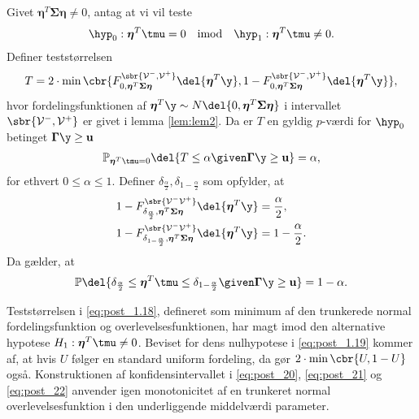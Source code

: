 \begin{lem} \label{lem:lem4}
Givet \(\boldsymbol{\eta}^T \boldsymbol{\Sigma} \boldsymbol{\eta} \neq 0\), antag at vi vil teste
\begin{align*}
\hyp_0: \boldsymbol{\eta}^T \tmu=0 \quad \text{imod} \quad \hyp_1: \boldsymbol{\eta}^T \tmu \neq 0.
\end{align*}
Definer teststørrelsen
\begin{align}
T=2 \cdot \min\cbr{F_{0, \boldsymbol{\eta}^T \boldsymbol{\Sigma} \boldsymbol{\eta}}^{\sbr{\mathcal{V}^-, \mathcal{V}^+}} \del{\boldsymbol{\eta}^T \y}, 1 - F_{0, \boldsymbol{\eta}^T \boldsymbol{\Sigma} \boldsymbol{\eta}}^{\sbr{\mathcal{V}^-, \mathcal{V}^+}} \del{\boldsymbol{\eta}^T \y}}, \label{eq:post_1.18}
\end{align}
hvor fordelingsfunktionen af \(\boldsymbol{\eta}^T \y \sim N \del{0,  \boldsymbol{\eta}^T \boldsymbol{\Sigma} \boldsymbol{\eta}}\) i intervallet \(\sbr{\mathcal{V}^-, \mathcal{V}^+}\) er givet i lemma \ref{lem:lem2}.
Da er \(T\) en gyldig \(p\)-værdi for \(\hyp_0\) betinget \(\boldsymbol{\Gamma} \y \geq \mathbf{u}\)
\begin{align}
\mathbb{P}_{\boldsymbol{\eta}^T \tmu=0} \del{T \leq \alpha \given \boldsymbol{\Gamma} \y \geq \mathbf{u}} = \alpha, \label{eq:post_1.19}
\end{align}
for ethvert \(0 \leq \alpha \leq 1\). 
Definer \(\delta_{\frac{\alpha}{2}}, \delta_{1-\frac{\alpha}{2}}\) som opfylder, at
\begin{align}
1-F_{\delta_{\frac{\alpha}{2}}, \boldsymbol{\eta}^T \boldsymbol{\Sigma} \boldsymbol{\eta}}^{\sbr{\mathcal{V}^- \mathcal{V}^+}} \del{\boldsymbol{\eta}^T \y} &= \frac{\alpha}{2}, \label{eq:post_20} \\
1-F_{\delta_{1-\frac{\alpha}{2}}, \boldsymbol{\eta}^T \boldsymbol{\Sigma} \boldsymbol{\eta} }^{\sbr{\mathcal{V}^- \mathcal{V}^+}} \del{\boldsymbol{\eta}^T \y} &= 1-\frac{\alpha}{2}. \label{eq:post_21}
\end{align}
Da gælder, at
\begin{align}
\mathbb{P} \del{\delta_{\frac{\alpha}{2}} \leq  \boldsymbol{\eta}^T \tmu \leq \delta_{1-\frac{\alpha}{2}} \given \boldsymbol{\Gamma} \y \geq \mathbf{u}} = 1- \alpha. \label{eq:post_22}
\end{align}
\end{lem}
%
Teststørrelsen i \eqref{eq:post_1.18}, defineret som minimum af den trunkerede normal fordelingsfunktion og overlevelsesfunktionen, har magt imod den alternative hypotese \(H_1: \boldsymbol{\eta}^T \tmu \neq 0\).
Beviset for dens nulhypotese i \eqref{eq:post_1.19} kommer af, at hvis \(U\) følger en standard uniform fordeling, da gør \(2 \cdot \min \cbr{U,1-U}\) også.
Konstruktionen af konfidensintervallet i \eqref{eq:post_20}, \eqref{eq:post_21} og \eqref{eq:post_22} anvender igen monotonicitet af en trunkeret normal overlevelsesfunktion i den underliggende middelværdi parameter.

